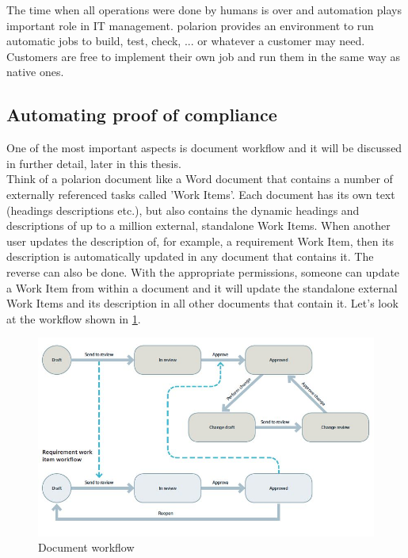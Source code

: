 \documentclass[thesis=M,english]{FITthesis}[2012/06/26]
\begin{document}
The time when all operations were done by humans is over and automation plays important role in IT management. \acrshort{polarion} provides an environment to run automatic jobs to build, test, check, ... or whatever a customer may need. Customers are free to implement their own job and run them in the same way as native ones.

\subsection{Automating proof of compliance}

One of the most important aspects is document workflow and it will be discussed in further detail, later in this thesis.\\ 


Think of a \acrshort{polarion} document like a Word document that contains a number of externally referenced tasks called 'Work Items'. Each document has its own text (headings descriptions etc.), but also contains the dynamic headings and descriptions of up to a million external, standalone Work Items. When another user updates the description of, for example, a requirement Work Item, then its description is automatically updated in any document that contains it. The reverse can also be done. With the appropriate permissions, someone can update a Work Item from within a document and it will update the standalone external Work Items and its description in all other documents that contain it. Let's look at the workflow shown in \ref{fig:document_workflow}.

\begin{figure}[h!]\centering
	\includegraphics[width=1\textwidth]{pictures/document_workflow}
	\caption{Document workflow \cite{polarion_alm}}\label{fig:document_workflow}
\end{figure}
\end{document}
